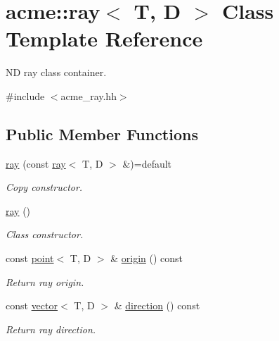 \hypertarget{classacme_1_1ray}{}\section{acme\+:\+:ray$<$ T, D $>$ Class Template Reference}
\label{classacme_1_1ray}


ND ray class container.  




{\ttfamily \#include $<$acme\+\_\+ray.\+hh$>$}

\subsection*{Public Member Functions}
\begin{DoxyCompactItemize}
\item 
\mbox{\label{classacme_1_1ray_a181a7fb12af08ba45ff41f39920df03c}} 
\hyperlink{classacme_1_1ray_a181a7fb12af08ba45ff41f39920df03c}{ray} (const \hyperlink{classacme_1_1ray}{ray}$<$ T, D $>$ \&)=default
\begin{DoxyCompactList}\small\item\em Copy constructor. \end{DoxyCompactList}\item 
\mbox{\label{classacme_1_1ray_afc8290a7430024f99fb291dbb5bbcc62}} 
\hyperlink{classacme_1_1ray_afc8290a7430024f99fb291dbb5bbcc62}{ray} ()
\begin{DoxyCompactList}\small\item\em Class constructor. \end{DoxyCompactList}\item 
\mbox{\label{classacme_1_1ray_a0d9212763d822b70260723d277ea3cf1}} 
const \hyperlink{classacme_1_1point}{point}$<$ T, D $>$ \& \hyperlink{classacme_1_1ray_a0d9212763d822b70260723d277ea3cf1}{origin} () const
\begin{DoxyCompactList}\small\item\em Return ray origin. \end{DoxyCompactList}\item 
\mbox{\label{classacme_1_1ray_af6ae286bbd1a15ba0c5f7419fc30a1fa}} 
const \hyperlink{classacme_1_1vector}{vector}$<$ T, D $>$ \& \hyperlink{classacme_1_1ray_af6ae286bbd1a15ba0c5f7419fc30a1fa}{direction} () const
\begin{DoxyCompactList}\small\item\em Return ray direction. \end{DoxyCompactList}\end{DoxyCompactItemize}



